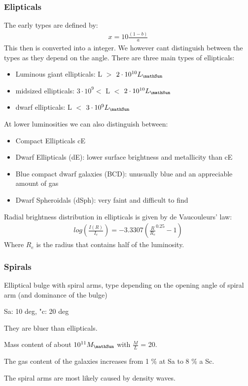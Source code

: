 \documentclass[11pt,a4paper]{article}
\begin{document}
\subsubsection{Elipticals}
The early types are defined by: 
\begin{align*}
    x = 10 \frac {(1-b)}{a}
\end{align*}
This then is converted into a integer.
We however cant distinguish between the types as they depend on the angle.
There are three main types of ellipticals:
\begin{itemize}
    \item Luminous giant ellipticals: L $>$ $2 \cdot 10^{10} L_\mathSun$
    \item midsized ellipticals: $3 \cdot 10^9 <$ L $<$ $2 \cdot 10^{10} L_\mathSun$
    \item dwarf ellipticals: L $<$ $3 \cdot 10^9 L_\mathSun$
\end{itemize}
At lower luminosities we can also distinguish between:
\begin{itemize}
    \item Compact Ellipticals cE 
    \item Dwarf Ellipticals (dE): lower surface brightness and metallicity than cE
    \item Blue compact dwarf galaxies (BCD): unusually blue and an appreciable
amount of gas
\item Dwarf Spheroidals (dSph): very faint and difficult to find
\end{itemize}
Radial brightness distribution in ellipticals is
given by de Vaucouleurs’ law:
\begin{align*}
    log (\frac {I(R)}{I_e})  = - 3.3307 (\frac {R}{R_e}^{0.25}-1)
\end{align*}
Where $R_e$ is the radius that contains half of the luminosity.
\subsubsection{Spirals}
Elliptical bulge with spiral arms, type depending on the opening angle of spiral arm (and dominance of the bulge)

Sa: 10 deg, "c: 20 deg

They are bluer than ellipticals.

Mass content of about $10^{11} M_\mathSun$ with $\frac M L $ = 20.

The gas content of the galaxies increases from 1 \% at Sa to 8 \%  a Sc.

The spiral arms are most likely caused by density waves.
\end{document}

